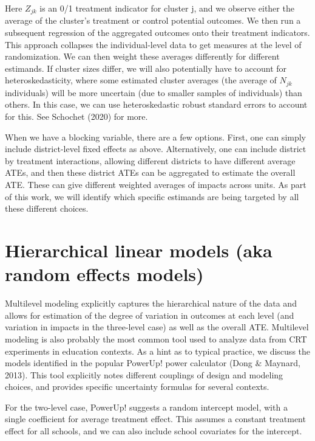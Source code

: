 \documentclass[]{article}
\begin{document}
Here $Z_{jk}$ is an 0/1 treatment indicator for cluster j, and we
observe either the average of the cluster's treatment or control
potential outcomes. We then run a subsequent regression of the
aggregated outcomes onto their treatment indicators. This approach
collapses the individual-level data to get measures at the level of
randomization. We can then weight these averages differently for
different estimands. If cluster sizes differ, we will also potentially
have to account for heteroskedasticity, where some estimated cluster
averages (the average of $N_{jk}$ individuals) will be more uncertain
(due to smaller samples of individuals) than others. In this case, we
can use heteroskedastic robust standard errors to account for this. See
Schochet (2020) for more.

When we have a blocking variable, there are a few options. First, one
can simply include district-level fixed effects as above. Alternatively,
one can include district by treatment interactions, allowing different
districts to have different average ATEs, and then these district ATEs
can be aggregated to estimate the overall ATE. These can give different
weighted averages of impacts across units. As part of this work, we will
identify which specific estimands are being targeted by all these
different choices.

\section{Hierarchical linear models (aka random effects models)}\label{hierarchical-linear-models-aka-random-effects-models}

Multilevel modeling explicitly captures the hierarchical nature of the
data and allows for estimation of the degree of variation in outcomes at
each level (and variation in impacts in the three-level case) as well as
the overall ATE. Multilevel modeling is also probably the most common
tool used to analyze data from CRT experiments in education contexts. As
a hint as to typical practice, we discuss the models identified in the
popular PowerUp! power calculator (Dong \& Maynard, 2013). This tool
explicitly notes different couplings of design and modeling choices, and
provides specific uncertainty formulas for several contexts.

For the two-level case, PowerUp! suggests a random intercept model, with
a single coefficient for average treatment effect. This assumes a
constant treatment effect for all schools, and we can also include
school covariates for the intercept.
\end{document}
